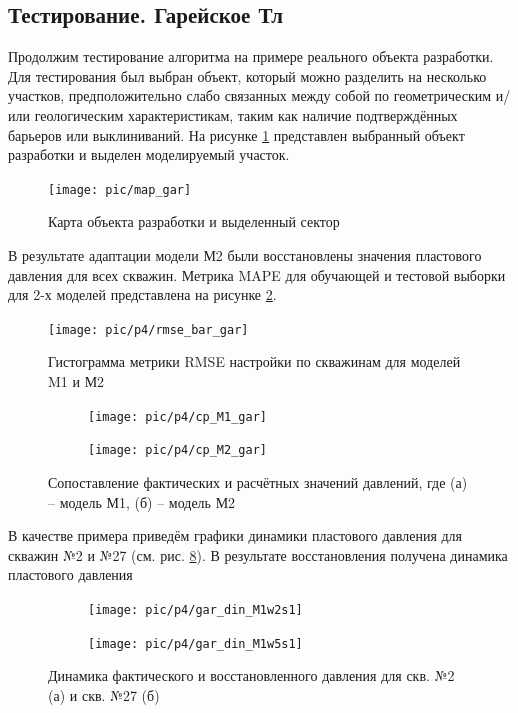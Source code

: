 \documentclass[14pt]{article}
\begin{document}
\subsection{Тестирование. Гарейское Тл}
Продолжим тестирование алгоритма на примере реального объекта разработки.
Для тестирования был выбран объект, который можно разделить на несколько участков, предположительно слабо связанных между собой по геометрическим и/или геологическим характеристикам, таким как наличие подтверждённых барьеров или выклиниваний.
На рисунке \ref{fig:mapgar} представлен выбранный объект разработки и выделен моделируемый участок.
\begin{figure}
	\centering
	\texttt{[image: pic/map\_gar]}
	\label{fig:mapgar}
	\caption{Карта объекта разработки и выделенный сектор}
\end{figure}

В результате адаптации модели М2 были восстановлены значения пластового давления для всех скважин. Метрика MAPE для обучающей и тестовой выборки для 2-х моделей представлена на рисунке \ref{fig:bar_mape_gar_s1s2}.
\begin{figure}
	\centering
	\texttt{[image: pic/p4/rmse\_bar\_gar]}
	\caption{Гистограмма метрики RMSE настройки по скважинам для моделей M1 и М2}
	\label{fig:bar_mape_gar_s1s2}
\end{figure}

\begin{figure}[!htb]
	\begin{subfigure}[b]{0.45\linewidth}
		\texttt{[image: pic/p4/cp\_M1\_gar]}
		\caption{}
		\label{fig:well9_cp_m1}
	\end{subfigure}
	\begin{subfigure}[b]{0.45\linewidth}
		\texttt{[image: pic/p4/cp\_M2\_gar]}
		\caption{}
		\label{fig:well9_cp_m2}
	\end{subfigure}
	\label{fig:well9_cp}
	\caption{Сопоставление фактических и расчётных значений давлений, где (а) -- модель М1, (б) -- модель М2}
\end{figure}

В качестве примера приведём графики динамики пластового давления для скважин №2 и №27 (см. рис. \ref{fig:din_gar_press_s1}).
В результате восстановления получена динамика пластового давления 

 \begin{figure}[!htb]
	\centering
	\begin{subfigure}[b]{0.9\linewidth}
		\texttt{[image: pic/p4/gar\_din\_M1w2s1]}
		\caption{}
		\label{fig:din_gar_press_2M2}
	\end{subfigure}
	\begin{subfigure}[b]{0.9\linewidth}
		\texttt{[image: pic/p4/gar\_din\_M1w5s1]}
		\caption{}
		\label{fig:din_gar_press_58M2}
	\end{subfigure}
	\label{fig:din_gar_press_s1}
	\caption{Динамика фактического и восстановленного давления для скв. №2 (а) и скв. №27 (б)}
\end{figure}
\end{document}
